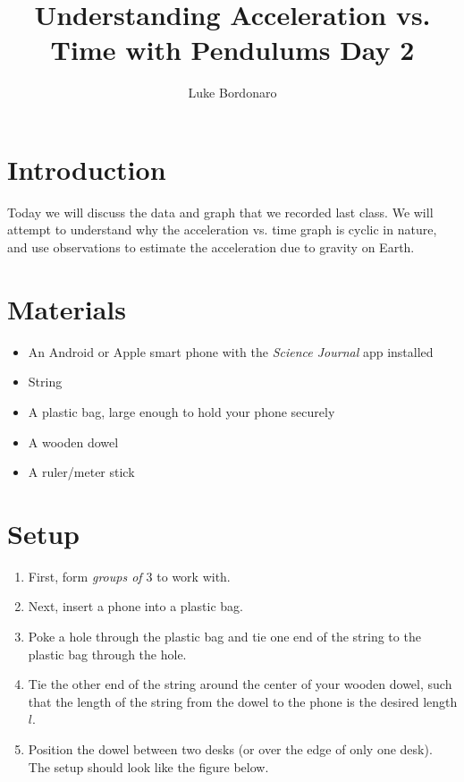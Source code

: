 \documentclass[a4paper]{article}
\title{Understanding Acceleration vs. Time with Pendulums Day 2}
\author{Luke Bordonaro}
\date{}
\begin{document}
\maketitle

\section{Introduction}

Today we will discuss the data and graph that we recorded last class. We will attempt to understand why the acceleration vs. time graph is cyclic in nature, and use observations to estimate the acceleration due to gravity on Earth. 

\section{Materials}
\begin{itemize}
    \item An Android or Apple smart phone with the \textit{Science Journal} app installed
    \item String
    \item A plastic bag, large enough to hold your phone securely
    \item A wooden dowel
    \item A ruler/meter stick
\end{itemize}

\section{Setup}

\begin{enumerate}
    \item First, form \textit{groups of $3$} to work with.
    \item Next, insert a phone into a plastic bag. 
    \item Poke a hole through the plastic bag and tie one end of the string to the plastic bag through the hole.
    \item Tie the other end of the string around the center of your wooden dowel, such that the length of the string from the dowel to the phone is the desired length $l$.
    \item Position the dowel between two desks (or over the edge of only one desk). The setup should look like the figure below.
\end{enumerate}
\end{document}
